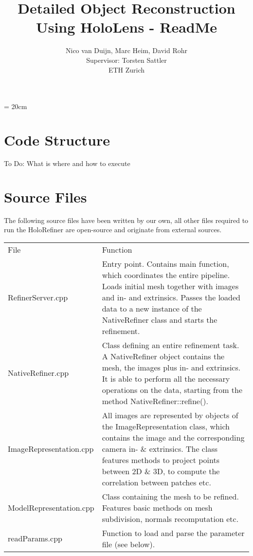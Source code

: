\documentclass[10pt,a4paper]{article}
\begin{document}
\textwidth = 20cm
\title{Detailed Object Reconstruction Using HoloLens - ReadMe}
\author{Nico van Duijn, Marc Heim, David Rohr\\
Supervisor: Torsten Sattler\\
ETH Zurich\\}
\date{}
\maketitle

\section{Code Structure}
To Do: What is where and how to execute 

\section{Source Files}
The following source files have been written by our own, all other files required to run the HoloRefiner are open-source and originate from external sources.

\begin{center}
\begin{tabular}{p{3.5cm}p{10cm}}
\renewcommand{\arraystretch}{1.5}
File & Function\\ \noalign{\smallskip} \hline \noalign{\smallskip}

RefinerServer.cpp & Entry point. Contains main function, which coordinates the entire pipeline. Loads initial mesh together with images and in- and extrinsics. Passes the loaded data to a new instance of the NativeRefiner class and starts the refinement.\\ \noalign{\smallskip} \hline \noalign{\smallskip}

NativeRefiner.cpp & Class defining an entire refinement task. A NativeRefiner object contains the mesh, the images plus in- and extrinsics. It is able to perform all the necessary operations on the data, starting from the method NativeRefiner::refine().\\ \noalign{\smallskip} \hline \noalign{\smallskip}

ImageRepresentation.cpp & All images are represented by objects of the ImageRepresentation class, which contains the image and the corresponding camera in- \& extrinsics. The class features methods to project points between 2D \& 3D, to compute the correlation between patches etc.\\ \noalign{\smallskip} \hline \noalign{\smallskip}

ModelRepresentation.cpp & Class containing the mesh to be refined. Features basic methods on mesh subdivision, normals recomputation etc.\\ \noalign{\smallskip} \hline \noalign{\smallskip}

readParams.cpp & Function to load and parse the parameter file (see below).

\end{tabular}
\end{center}
\end{document}
